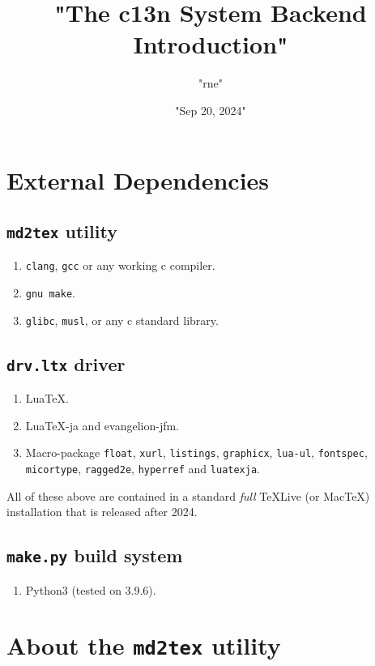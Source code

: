 \title{"The c13n System Backend Introduction"}
\author{"rne"}
\date{"Sep 20, 2024"}
\maketitle
\chapter{External Dependencies}
\section{\texttt{md2tex} utility}
\begin{enumerate}
\item \verb!clang!, \verb!gcc! or any working c compiler.
\item \verb!gnu make!.
\item \verb!glibc!, \verb!musl!, or any c standard library.
\end{enumerate}
\section{\texttt{drv.ltx} driver}
\begin{enumerate}
\item LuaTeX.
\item LuaTeX-ja and evangelion-jfm.
\item Macro-package \verb!float!, \verb!xurl!, \verb!listings!, \verb!graphicx!, \verb!lua-ul!, \verb!fontspec!, \verb!micortype!, \verb!ragged2e!, \verb!hyperref! and \verb!luatexja!.
\end{enumerate}
All of these above are contained in a standard \textit{full} TeXLive (or MacTeX) installation that is released after 2024.\par
\section{\texttt{make.py} build system}
\begin{enumerate}
\item Python3 (tested on 3.9.6).
\end{enumerate}
\chapter{About the \texttt{md2tex} utility}

